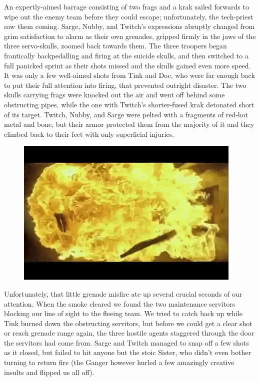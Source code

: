 An expertly-aimed barrage consisting of two frags and a krak sailed forwards to wipe out the enemy team before they could escape; 
unfortunately, the tech-priest saw them coming. 
Sarge, Nubby, and Twitch's expressions abruptly changed from grim satisfaction to alarm as their own grenades, gripped firmly in the jaws of the three servo-skulls, zoomed back towards them. 
The three troopers began frantically backpedalling and firing at the suicide skulls, and then switched to a full panicked sprint as their shots missed and the skulls gained even more speed. 
It was only a few well-aimed shots from Tink and Doc, who were far enough back to put their full attention into firing, that prevented outright disaster. 
The two skulls carrying frags were knocked out the air and went off behind some obstructing pipes, while the one with Twitch's shorter-fused krak detonated short of its target. 
Twitch, Nubby, and Sarge were pelted with a fragments of red-hot metal and bone, but their armor protected them from the majority of it and they climbed back to their feet with only superficial injuries.

\begin{figure}
	\begin{center}
		\includegraphics[width=\figwidth]{pics/18/18.png}
	\end{center}
\end{figure}
Unfortunately, that little grenade misfire ate up several crucial seconds of our attention. 
When the smoke cleared we found the two maintenance servitors blocking our line of sight to the fleeing team. 
We tried to catch back up while Tink burned down the obstructing servitors, but before we could get a clear shot or reach grenade range again, the three hostile agents staggered through the door the servitors had come from. 
Sarge and Twitch managed to snap off a few shots as it closed, but failed to hit anyone but the stoic Sister, who didn't even bother turning to return fire (the Ganger however hurled a few amazingly creative insults and flipped us all off). 


